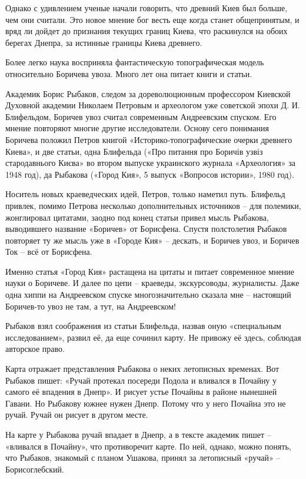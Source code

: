 Однако с удивлением ученые начали говорить, что древний Киев был больше, чем они считали. Это новое мнение бог весть еще когда станет общепринятым, и вряд ли дойдет до признания текущих границ Киева, что раскинулся на обоих берегах Днепра, за истинные границы Киева древнего.

Более легко наука восприняла фантастическую топографическая модель относительно Боричева увоза. Много лет она питает книги и статьи.

Академик Борис Рыбаков, следом за дореволюционным профессором Киевской Духовной академии Николаем Петровым и археологом уже советской эпохи Д. И. Блифельдом, Боричев увоз считал современным Андреевским спуском. Его мнение повторяют многие другие исследователи. Основу сего понимания Боричева положил Петров книгой «Историко-топографические очерки древнего Киева», и две статьи, одна Блифельда («Про питання про Боричів узвіз стародавнього Києва» во втором выпуске украинского журнала «Археология» за 1948 год), да Рыбакова («Город Кия», 5 выпуск «Вопросов истории», 1980 год).

Носитель новых краеведческих идей, Петров, только наметил путь. Блифельд привлек, помимо Петрова несколько дополнительных источников – для полемики, жонглировал цитатами, заодно под конец статьи привел мысль Рыбакова, выводившего название «Боричев» от Борисфена. Спустя полстолетия Рыбаков повторяет ту же мысль уже в «Городе Кия» – дескать, и Боричев увоз, и Боричев Ток – всё от Борисфена.

Именно статья «Город Кия» растащена на цитаты и питает современное мнение науки о Боричеве. И далее по цепи – краеведы, экскурсоводы, журналисты. Даже одна хиппи на Андреевском спуске многозначительно сказала мне – настоящий Боричев-то увоз не там, а тут, на Андреевском!

Рыбаков взял соображения из статьи Блифельда, назвав оную «специальным исследованием», развил её, да еще сочинил карту. Не привожу её здесь, соблюдая авторское право.

Карта отражает представления Рыбакова о неких летописных временах. Вот Рыбаков пишет: «Ручай протекал посереди Подола и вливался в Почайну у самого её впадения в Днепр». И рисует устье Почайны в районе нынешней Гавани. Но Рыбакову южнее нужен Днепр. Потому что у него Почайна это не ручай. Ручай он рисует в другом месте.

На карте у Рыбакова ручай впадает в Днепр, а в тексте академик пишет – «вливался в Почайну», что противоречит карте. По ней, однако, можно понять, что Рыбаков, знакомый с планом Ушакова, принял за летописный «ручай» – Борисоглебский. 

